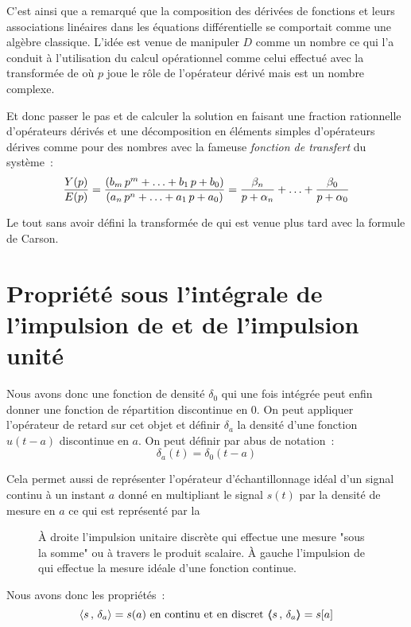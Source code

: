 C'est ainsi que \Heaviside{} a remarqué que la composition des
dérivées de fonctions et leurs associations linéaires dans les
équations différentielle se comportait comme une algèbre
classique. L'idée est venue de manipuler $D$ comme un nombre ce qui
l'a conduit à l'utilisation du calcul opérationnel comme celui
effectué avec la transformée de \Laplace{} où $p$ joue le rôle de
l'opérateur dérivé mais est un nombre complexe.

Et donc passer le pas et de calculer la solution en faisant une
fraction rationnelle d'opérateurs dérivés et une décomposition en
éléments simples d'opérateurs dérives comme pour des nombres avec la
fameuse \emph{fonction de transfert} du système~:
$$
\frac{Y\!\left(p\right)}{E\!\left(p\right)} = \frac{\left(b_m\,p^m + \ldots +b_1\, p +
    b_0\right)}{\left(a_n\,p^n + \ldots +a_1\, p + a_0\right)}= \frac{\beta_n}{p +
  \alpha_n} + \ldots + \frac{\beta_0}{p + \alpha_0}
$$

Le tout sans avoir défini la transformée de \Laplace{} qui est venue
plus tard avec la formule de Carson.


\section{Propriété sous l'intégrale de l'impulsion de \Dirac{} et de
  l'impulsion unité}
\label{sec:dirac_sous_integrale}
Nous avons donc une fonction de densité $\delta_0$ qui une fois
intégrée peut enfin donner une fonction de répartition discontinue en
$0$. On peut appliquer l'opérateur de retard sur cet objet et définir
$\delta_a$ la densité d'une fonction $u(t-a)$ discontinue en $a$. On
peut définir par abus de notation~:
$$
\delta_a(t)= \delta_0(t-a)
$$

Cela permet aussi de représenter l'opérateur d'échantillonnage idéal
d'un signal continu à un instant $a$ donné en multipliant le signal
$s(t)$ par la densité de mesure en $a$ ce qui est représenté par
la~
\begin{figure}[ht!]
  \centering {}
  \caption{À droite l'impulsion unitaire discrète qui effectue une
    mesure "sous la somme" ou à travers le produit scalaire. À gauche
    l'impulsion de \Dirac{} qui effectue la mesure idéale d'une
    fonction continue.}
  \label{fig:delta_mesure}
\end{figure}

Nous avons donc les propriétés~:
$$
\langle s\,,\,\delta_a\rangle=s(a) \text{ en continu et en discret }
\langle\!\!\langle s\,,\,\delta_a\rangle\!\!\rangle=s[a]
$$

